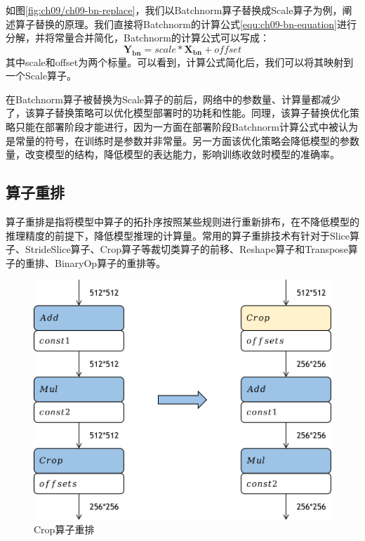 如图\ref{fig:ch09/ch09-bn-replace}，我们以Batchnorm算子替换成Scale算子为例，阐述算子替换的原理。我们直接将Batchnorm的计算公式\ref{equ:ch09-bn-equation}进行分解，并将常量合并简化，Batchnorm的计算公式可以写成：
\begin{equation}\label{equ:ch09-replace-scale}
\bm{Y_{bn}}=scale*\bm{X_{bn}}+offset
\end{equation}
其中scale和offset为两个标量。可以看到，计算公式简化后，我们可以将其映射到一个Scale算子。

在Batchnorm算子被替换为Scale算子的前后，网络中的参数量、计算量都减少了，该算子替换策略可以优化模型部署时的功耗和性能。同理，该算子替换优化策略只能在部署阶段才能进行，因为一方面在部署阶段Batchnorm计算公式中被认为是常量的符号，在训练时是参数并非常量。另一方面该优化策略会降低模型的参数量，改变模型的结构，降低模型的表达能力，影响训练收敛时模型的准确率。

\subsection{算子重排}
算子重排是指将模型中算子的拓扑序按照某些规则进行重新排布，在不降低模型的推理精度的前提下，降低模型推理的计算量。常用的算子重排技术有针对于Slice算子、StrideSlice算子、Crop算子等裁切类算子的前移、Reshape算子和Transpose算子的重排、BinaryOp算子的重排等。

\begin{figure}[h]
\centering
\includegraphics[scale=0.6]{figs/ch09/ch09-crop-reorder.png}
\caption{Crop算子重排}
\label{fig:ch09/ch09-crop-reorder}
\end{figure}

